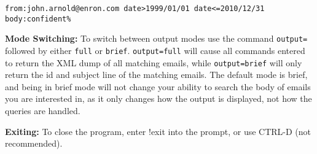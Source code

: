 \verb|from:john.arnold@enron.com date>1999/01/01 date<=2010/12/31 body:confident%|

\textbf{Mode Switching: }
To switch between output modes use the command \verb|output=| followed by either \verb|full| or 
\verb|brief|.  \verb|output=full| will cause all commands entered to return the XML dump of all 
matching emails, while \verb|output=brief| will only return the id and subject line of the matching 
emails.  The default mode is brief, and being in brief mode will not change your ability to search 
the body of emails you are interested in, as it only changes how the output is displayed, not how 
the queries are handled. 

\textbf{Exiting: }
To close the program, enter !exit into the prompt, or use CTRL-D (not recommended).   

